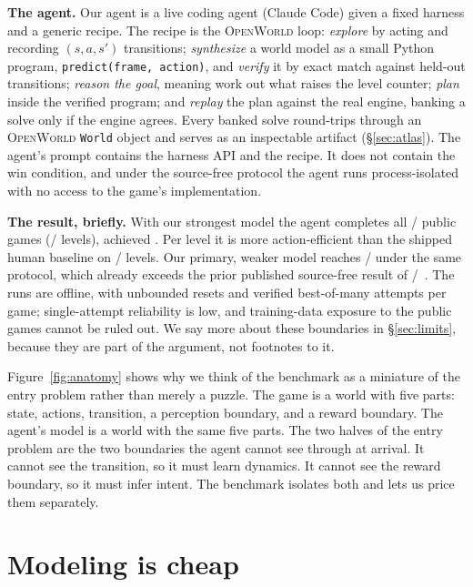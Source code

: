 \documentclass[11pt]{article}
\newcommand{\openworld}{\textsc{OpenWorld}}
\begin{document}
\textbf{The agent.} Our agent is a live coding agent (Claude Code) given a fixed harness and a generic
recipe. The recipe is the \openworld{} loop: \emph{explore} by acting and recording $(s, a, s')$
transitions; \emph{synthesize} a world model as a small Python program, \texttt{predict(frame, action)},
and \emph{verify} it by exact match against held-out transitions; \emph{reason the goal}, meaning work out
what raises the level counter; \emph{plan} inside the verified program; and \emph{replay} the plan against
the real engine, banking a solve only if the engine agrees. Every banked solve round-trips through an
\openworld{} \texttt{World} object and serves as an inspectable artifact (\S\ref{sec:atlas}). The
agent's prompt contains the harness API and the recipe. It does not contain the win condition, and under
the source-free protocol the agent runs process-isolated with no access to the game's implementation.

\textbf{The result, briefly.} With our strongest model the agent completes all
\ArcFableFull/\ArcUnionGames{} public games (\ArcFableLevels/\ArcTotalLevels{} levels), achieved
\ArcMilestoneUTC{}. Per level it is more action-efficient than the shipped human baseline on
\ArcRhaeLevelsOverHuman/\ArcRhaeNLevels{} levels. Our primary, weaker model reaches
\ArcSFGames/\ArcUnionGames{} under the same protocol, which already exceeds the prior published
source-free result of \ArcBaselineFull/\ArcUnionGames{}~\cite{baseline1_ewm}. The runs are offline, with
unbounded resets and verified best-of-many attempts per game; single-attempt reliability is low, and
training-data exposure to the public games cannot be ruled out. We say more about these boundaries in
\S\ref{sec:limits}, because they are part of the argument, not footnotes to it.

Figure~\ref{fig:anatomy} shows why we think of the benchmark as a miniature of the entry problem rather
than merely a puzzle. The game is a world with five parts: state, actions, transition, a perception
boundary, and a reward boundary. The agent's model is a world with the same five parts. The two halves
of the entry problem are the two boundaries the agent cannot see through at arrival. It cannot see the
transition, so it must learn dynamics. It cannot see the reward boundary, so it must infer intent. The
benchmark isolates both and lets us price them separately.

\section{Modeling is cheap}
\label{sec:cheap}
\end{document}
